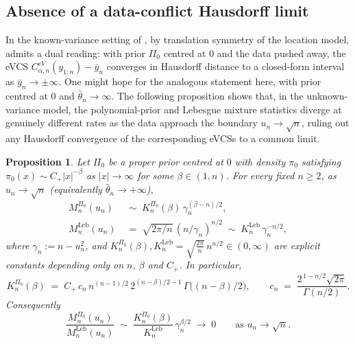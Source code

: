 \documentclass[12pt, a4paper]{report}
\newcommand{\Leb}{\mathrm{Leb}}
\newtheorem{proposition}[theorem]{Proposition}
\newcommand{\1}{\mathbf{1}}
\begin{document}
\subsection{Absence of a data-conflict Hausdorff limit}
In the known-variance setting of \cite{Cortinovis2025}, by translation symmetry of the location model, \cite[Theorem~4.3]{Cortinovis2025} admits a dual reading: with prior \(\Pi_0\) centred at \(0\) and the data pushed away, the eVCS \(C^{eV}_{\alpha,n}(y_{1:n})-\bar y_n\) converges in Hausdorff distance to a closed-form interval as \(\bar y_n\to\pm\infty\). One might hope for the analogous statement here, with prior centred at \(0\) and \(\widehat\theta_n\to\infty\). The following proposition shows that, in the unknown-variance model, the polynomial-prior and Lebesgue mixture statistics diverge at genuinely different rates as the data approach the boundary \(u_n\to\sqrt n\), ruling out any Hausdorff convergence of the corresponding eVCSs to a common limit.

\begin{proposition}\label{prop:rate-mismatch}
Let \(\Pi_0\) be a proper prior centred at \(0\) with density
\(\pi_0\) satisfying
\(\pi_0(x)\sim C_+|x|^{-\beta}\) as \(|x|\to\infty\)
for some \(\beta\in(1,n)\). For every fixed \(n\geq 2\), as
\(u_n\to\sqrt n\) (equivalently \(\widehat\theta_n\to+\infty\)),
\begin{align}
   M_n^{\Pi_0}(u_n) &\;\sim\;
       K_n^{\Pi_0}(\beta)\,\gamma_n^{(\beta-n)/2},
       \label{eq:Mn-rate}\\[2pt]
   M_n^{\Leb}(u_n) &\;=\;
       \sqrt{2\pi/n}\,(n/\gamma_n)^{n/2}
       \;\sim\;K_n^{\Leb}\,\gamma_n^{-n/2},
       \label{eq:Mleb-rate}
\end{align}
where \(\gamma_n:=n-u_n^2\), and
\(K_n^{\Pi_0}(\beta), K_n^{\Leb} = \sqrt{\frac{2\pi}{n}} \, n^{n/2} \in(0,\infty)\) are explicit
constants depending only on \(n\), \(\beta\) and \(C_+\). In
particular,
\[
  K_n^{\Pi_0}(\beta) \;=\; C_+\, c_n\, n^{(n-1)/2}\, 2^{(n-\beta)/2-1}\, 
\Gamma\!\bigl((n-\beta)/2\bigr),
\qquad
c_n \;=\; \frac{2^{\,1-n/2}\sqrt{2\pi}}{\Gamma(n/2)}.
\]
Consequently
\begin{equation}\label{eq:rate-mismatch}
   \frac{M_n^{\Pi_0}(u_n)}{M_n^{\Leb}(u_n)}
   \;\sim\;\frac{K_n^{\Pi_0}(\beta)}{K_n^{\Leb}}\,\gamma_n^{\beta/2}
   \;\longrightarrow\;0\qquad\text{as }u_n\to\sqrt n.
\end{equation}
\end{proposition}
\end{document}
